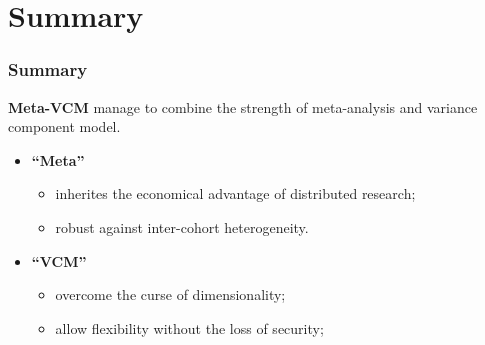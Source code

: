 \documentclass{beamer}
\begin{document}
\section{Summary}
\begin{frame} %
  \frametitle{Summary} %
  \textbf{Meta-VCM} manage to combine the strength of meta-analysis and
  variance component model.
  \begin{itemize}
  \item \textbf{``Meta''}
    \begin{itemize}
    \item inherites the economical advantage of distributed research;
    \item robust against inter-cohort heterogeneity.
    \end{itemize}
  \item \textbf{``VCM''}
    \begin{itemize}
    \item overcome the curse of dimensionality;
    \item allow flexibility without the loss of security;
    \end{itemize}
  \end{itemize}
\end{frame}
\end{document}
